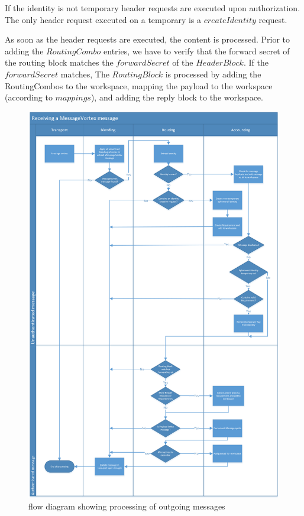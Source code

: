 If the identity is not temporary header requests are executed upon authorization. The only header request executed on a temporary  is a $createIdentity$ request. 

As soon as the header requests are executed, the content is processed. Prior to adding the $RoutingCombo$ entries, we have to verify  that the forward secret of the routing block matches the $forwardSecret$ of the $HeaderBlock$. If the $forwardSecret$ matches, The $RoutingBlock$ is processed by adding the RoutingCombos to the workspace, mapping the payload to the workspace (according to $mappings$), and adding the reply block to the workspace.

\begin{figure}[ht]
	\centering
	\includegraphics[height=0.75\textheight]{inc/flowchart_message_receiving}
	\caption{flow diagram showing processing of outgoing messages}
	\label{fig:msgReceiveProcessing}
\end{figure}

